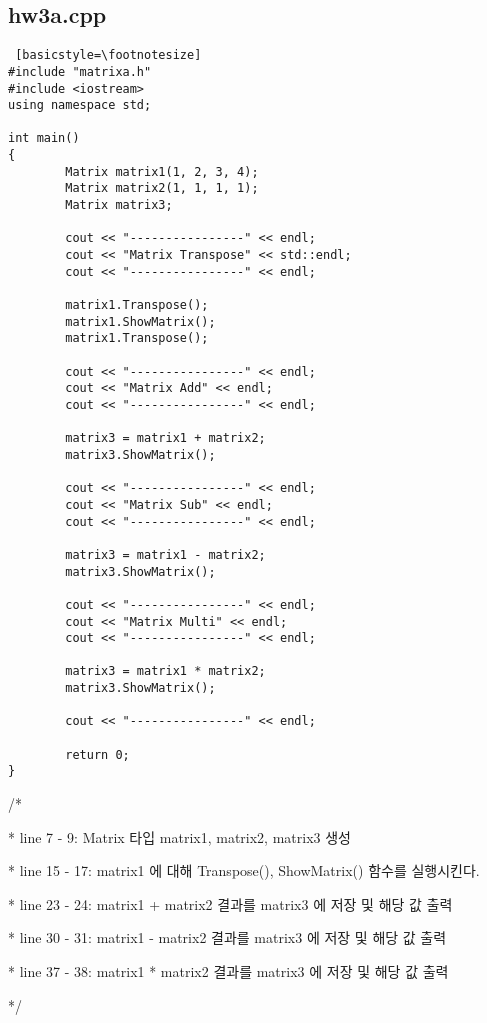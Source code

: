 \documentclass[twoside,twocolumn]{article}
\newenvironment{itemizeReduced}{
\begin{list}{\labelitemi}{\leftmargin=1em}
\setlength{\itemsep}{1pt}
\setlength{\parskip}{0pt}
\setlength{\parsep}{0pt}}{\end{list}
}
\begin{document}
\subsection{hw3a.cpp}
\begin{lstlisting} [basicstyle=\footnotesize]
#include "matrixa.h"
#include <iostream>
using namespace std;

int main()
{
        Matrix matrix1(1, 2, 3, 4);
        Matrix matrix2(1, 1, 1, 1);
        Matrix matrix3;

        cout << "----------------" << endl;
        cout << "Matrix Transpose" << std::endl;
        cout << "----------------" << endl;

        matrix1.Transpose();
        matrix1.ShowMatrix();
        matrix1.Transpose();

        cout << "----------------" << endl;
        cout << "Matrix Add" << endl;
        cout << "----------------" << endl;

        matrix3 = matrix1 + matrix2;
        matrix3.ShowMatrix();

        cout << "----------------" << endl;
        cout << "Matrix Sub" << endl;
        cout << "----------------" << endl;

        matrix3 = matrix1 - matrix2;
        matrix3.ShowMatrix();

        cout << "----------------" << endl;
        cout << "Matrix Multi" << endl;
        cout << "----------------" << endl;

        matrix3 = matrix1 * matrix2;
        matrix3.ShowMatrix();

        cout << "----------------" << endl;

        return 0;
}
\end{lstlisting}
\begin{itemizeReduced}
    \item[/*] 
    \item[*] line 7 - 9: Matrix 타입 matrix1, matrix2, matrix3 생성
    \item[*] line 15 - 17: matrix1 에 대해 Transpose(), ShowMatrix() 함수를 실행시킨다.
    \item[*] line 23 - 24: matrix1 + matrix2 결과를 matrix3 에 저장 및 해당 값 출력
    \item[*] line 30 - 31: matrix1 - matrix2 결과를 matrix3 에 저장 및 해당 값 출력
    \item[*] line 37 - 38: matrix1 * matrix2 결과를 matrix3 에 저장 및 해당 값 출력
    
\end{itemizeReduced}
*/
\end{document}
